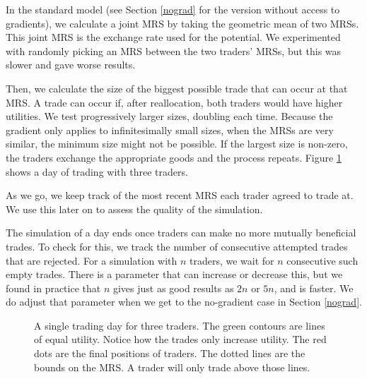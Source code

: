 \documentclass[12pt,a4paper,titlepage]{article}
\begin{document}
In the standard model (see Section \ref{nograd} for the version without access to gradients), we calculate a joint MRS by taking the geometric mean of two MRSs.
This joint MRS is the exchange rate used for the potential.
We experimented with randomly picking an MRS between the two traders' MRSs, but this was slower and gave worse results.

Then, we calculate the size of the biggest possible trade that can occur at that MRS.
A trade can occur if, after reallocation, both traders would have higher utilities.
We test progressively larger sizes, doubling each time.
Because the gradient only applies to infinitesimally small sizes, when the MRSs are very similar, the minimum size might not be possible.
If the largest size is non-zero, the traders exchange the appropriate goods and the process repeats.
Figure \ref{fig:day} shows a day of trading with three traders.

As we go, we keep track of the most recent MRS each trader agreed to trade at.
We use this later on to assess the quality of the simulation.

The simulation of a day ends once traders can make no more mutually beneficial trades.
To check for this, we track the number of consecutive attempted trades that are rejected. 
For a simulation with $n$ traders, we wait for $n$ consecutive such empty trades.
There is a parameter that can increase or decrease this, but we found in practice that $n$ gives just as good results as $2n$ or $5n$, and is faster.
We do adjust that parameter when we get to the no-gradient case in Section \ref{nograd}.

\begin{figure}[H]
    \centering
    
    \caption{
      A single trading day for three traders.
      The green contours are lines of equal utility.
      Notice how the trades only increase utility.
      The red dots are the final positions of traders.
      The dotted lines are the bounds on the MRS.
      A trader will only trade above those lines.
    }
    \label{fig:day}
\end{figure}
\end{document}
